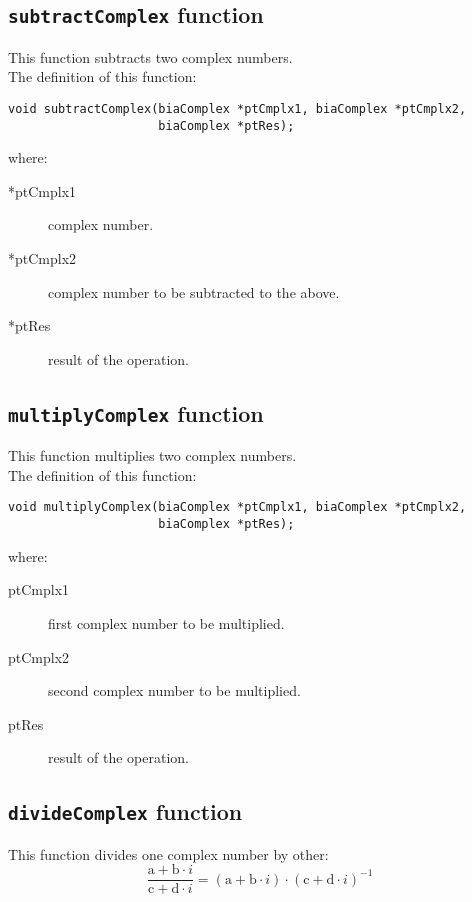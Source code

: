 \subsection{\texttt{subtractComplex} function}

This function subtracts two complex numbers.\\

The definition of this function:
%
\begin{verbatim}
void subtractComplex(biaComplex *ptCmplx1, biaComplex *ptCmplx2, 
                     biaComplex *ptRes);  
\end{verbatim}
%
where:
%
\begin{description}
\item[*ptCmplx1] complex number.
\item[*ptCmplx2] complex number to be subtracted to the above.
\item[*ptRes] result of the operation.
\end{description}

\subsection{\texttt{multiplyComplex} function}

This function multiplies two complex numbers.\\

The definition of this function:
%
\begin{verbatim}
void multiplyComplex(biaComplex *ptCmplx1, biaComplex *ptCmplx2, 
                     biaComplex *ptRes);  
\end{verbatim}
%
where:
%
\begin{description}
\item[ptCmplx1] first complex number to be multiplied. 
\item[ptCmplx2] second complex number to be multiplied.
\item[ptRes] result of the operation.
\end{description}

\subsection{\texttt{divideComplex} function}

This function divides one complex number by other:
%
\begin{displaymath}
\frac{\mathrm{a} + \mathrm{b} \cdot i}{\mathrm{c} + \mathrm{d} \cdot i} = (\mathrm{a} + \mathrm{b} \cdot i) \cdot (\mathrm{c} + \mathrm{d} \cdot i)^{-1}  
\end{displaymath}

